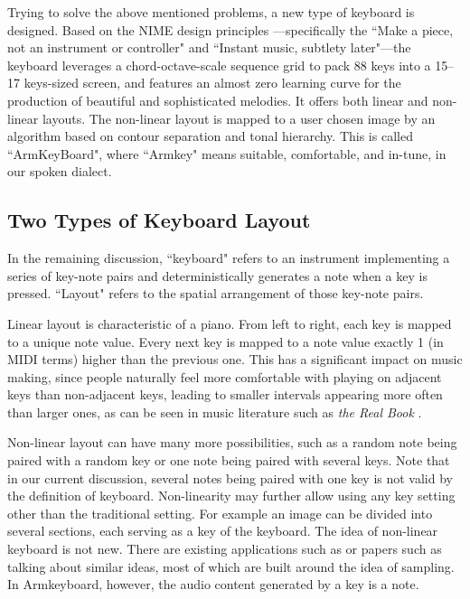 Trying to solve the above mentioned problems, a new type of keyboard is designed. Based on the NIME design principles \cite{cook2001principles}---specifically the ``Make a piece, not an instrument or controller" and ``Instant music, subtlety later"---the keyboard leverages a chord-octave-scale sequence grid to pack 88 keys into a 15--17 keys-sized screen, and features an almost zero learning curve for the production of beautiful and sophisticated melodies. It offers both linear and non-linear layouts. The non-linear layout is mapped to a user chosen image by an algorithm based on contour separation and tonal hierarchy. This is called ``ArmKeyBoard", where ``Armkey" means suitable, comfortable, and in-tune, in our spoken dialect.

\subsection{Two Types of Keyboard Layout}
In the remaining discussion, ``keyboard" refers to an instrument implementing a series of key-note pairs and deterministically
generates a note when a key is pressed. ``Layout" refers to the spatial arrangement of those key-note pairs.

Linear layout is characteristic of a piano. From left to right, each key is mapped to a unique note value. Every next key is mapped to
a note value exactly 1 (in MIDI terms) higher than the previous one. This has a significant impact on music making, since people naturally feel more comfortable with playing on adjacent keys than non-adjacent keys, leading to smaller intervals appearing more often than larger ones, as can be seen in music literature such as \textit{the Real Book} \cite{therealbook6th}.

Non-linear layout can have many more possibilities, such as a random note being paired with a random key or one note being paired with
several keys. Note that in our current discussion, several notes being paired with one key is not valid by the definition of keyboard. Non-linearity may further allow using any key setting other than the traditional setting. For example an image can be divided into several sections, each serving as a key of the keyboard. The idea of non-linear keyboard is not new. There are existing applications such as \cite{kontakts} or papers such as \cite{kruge2011madpad} talking about similar ideas, most of which are built around the idea of sampling. In Armkeyboard, however, the audio content generated by a key is a note.

